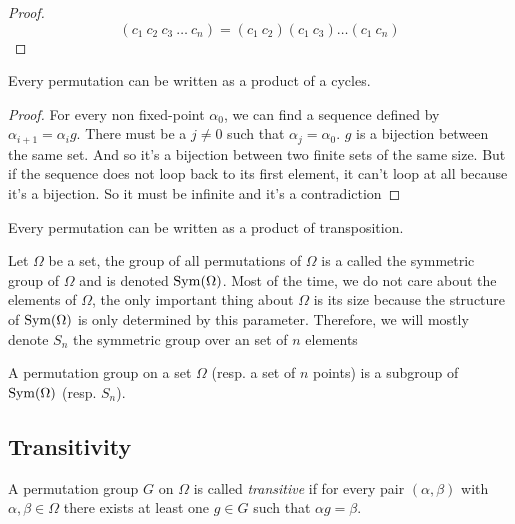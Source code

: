 \begin{proof}
  \[
    (c_1\ c_2\ c_3\ \dots\ c_n) = (c_1\ c_2)(c_1\ c_3)\dots(c_1\ c_n)
  \]
\end{proof}

\begin{proposition}
  Every permutation can be written as a product of a cycles.
\end{proposition}

\begin{proof}
  For every non fixed-point $\alpha_0$, we can find a sequence defined by $\alpha_{i+1} = \alpha_i g$. There must be a $j \neq 0$ such that $\alpha_j = \alpha_0$. $g$ is a bijection between the same set. And so it's a bijection between two finite sets of the same size. But if the sequence does not loop back to its first element, it can't loop at all because it's a bijection. So it must be infinite and it's a contradiction
\end{proof}

\begin{corollary}
  Every permutation can be written as a product of transposition.
\end{corollary}

\begin{definition}
  Let $\Omega$ be a set, the group of all permutations of $\Omega$ is a called the symmetric group of $\Omega$ and is denoted $\operatorname{Sym}(\Omega)$. Most of the time, we do not care about the elements of $\Omega$, the only important thing about $\Omega$ is its size because the structure of $\operatorname{Sym}(\Omega)$ is only determined by this parameter. Therefore, we will mostly denote $S_n$ the symmetric group over an set of $n$ elements
\end{definition}

\begin{definition}
  A permutation group on a set $\Omega$ (resp. a set of $n$ points) is a subgroup of $\operatorname{Sym}(\Omega)$ (resp. $S_n$).
\end{definition}

\subsection{Transitivity}

\begin{definition}
  A permutation group $G$ on $\Omega$ is called \textit{transitive} if for every pair $(\alpha, \beta)$ with $\alpha, \beta \in \Omega$ there exists at least one $g \in G$ such that $\alpha g = \beta$.
\end{definition}


